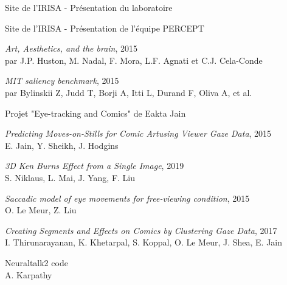 
\begin{thebibliography}{99}

	  Site de l'IRISA - Présentation du laboratoire\\
      
	  Site de l'IRISA - Présentation de l'équipe PERCEPT\\

    \emph{Art, Aesthetics, and the brain}, 2015\\
    par J.P. Huston, M. Nadal, F. Mora, L.F. Agnati et C.J. Cela-Conde

    \emph{MIT saliency benchmark}, 2015\\
    par Bylinskii Z, Judd T, Borji A, Itti L, Durand F, Oliva A, et al.\\

    Projet "Eye-tracking and Comics" de Eakta Jain\\

    \emph{Predicting Moves-on-Stills for Comic Artusing Viewer Gaze Data}, 2015\\
    E. Jain, Y. Sheikh, J. Hodgins\\

    \emph{3D Ken Burns Effect from a Single Image}, 2019\\
    S. Niklaus, L. Mai, J. Yang, F. Liu\\

    \emph{Saccadic model of eye movements for free-viewing condition}, 2015\\
    O. Le Meur, Z. Liu\\

    \emph{Creating Segments and Effects on Comics by Clustering Gaze Data}, 2017\\
    I. Thirunarayanan, K. Khetarpal, S. Koppal, O. Le Meur, J. Shea, E. Jain\\

    Neuraltalk2 code\\
    A. Karpathy\\

\end{thebibliography}
